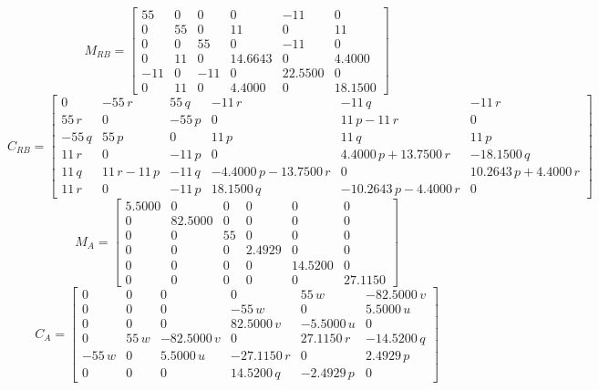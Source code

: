 \documentclass[12pt,a4]{article}
\begin{document}
\begin{equation*}
 	M_{RB} = \left[\begin{array}{cccccc} 55 & 0 & 0 & 0 & -11 & 0\\ 0 & 55 & 0 & 11 & 0 & 11\\ 0 & 0 & 55 & 0 & -11 & 0\\ 0 & 11 & 0 & 14.6643 & 0 & 4.4000\\ -11 & 0 & -11 & 0 & 22.5500 & 0\\ 0 & 11 & 0 & 4.4000 & 0 & 18.1500 \end{array}\right]
\end{equation*}
\begin{equation*}
 	C_{RB} = \left[\begin{array}{cccccc} 0 & -55\,r & 55\,q & -11\,r & -11\,q & -11\,r\\ 55\,r & 0 & -55\,p & 0 & 11\,p-11\,r & 0\\ -55\,q & 55\,p & 0 & 11\,p & 11\,q & 11\,p\\ 11\,r & 0 & -11\,p & 0 & 4.4000\,p+13.7500\,r & -18.1500\,q\\ 11\,q & 11\,r-11\,p & -11\,q & -4.4000\,p-13.7500\,r & 0 & 10.2643\,p+4.4000\,r\\ 11\,r & 0 & -11\,p & 18.1500\,q & -10.2643\,p-4.4000\,r & 0 \end{array}\right]
\end{equation*}
\begin{equation*}
 	M_{A} = \left[\begin{array}{cccccc} 5.5000 & 0 & 0 & 0 & 0 & 0\\ 0 & 82.5000 & 0 & 0 & 0 & 0\\ 0 & 0 & 55 & 0 & 0 & 0\\ 0 & 0 & 0 & 2.4929 & 0 & 0\\ 0 & 0 & 0 & 0 & 14.5200 & 0\\ 0 & 0 & 0 & 0 & 0 & 27.1150 \end{array}\right]
\end{equation*}
\begin{equation*}
 	C_{A} = \left[\begin{array}{cccccc} 0 & 0 & 0 & 0 & 55\,w & -82.5000\,v\\ 0 & 0 & 0 & -55\,w & 0 & 5.5000\,u\\ 0 & 0 & 0 & 82.5000\,v & -5.5000\,u & 0\\ 0 & 55\,w & -82.5000\,v & 0 & 27.1150\,r & -14.5200\,q\\ -55\,w & 0 & 5.5000\,u & -27.1150\,r & 0 & 2.4929\,p\\ 0 & 0 & 0 & 14.5200\,q & -2.4929\,p & 0 \end{array}\right]
\end{equation*}
\end{document}
